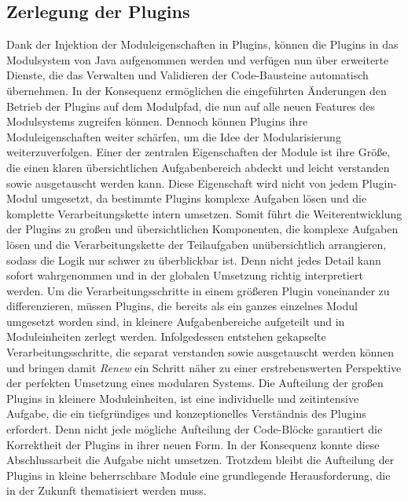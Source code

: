  \subsection*{Zerlegung der Plugins}
	Dank der Injektion der Moduleigenschaften in Plugins, können die Plugins in das Modulsystem von Java aufgenommen werden und verfügen nun über erweiterte Dienste, die das Verwalten und Validieren der Code-Bausteine automatisch übernehmen. In der Konsequenz ermöglichen die eingeführten Änderungen den Betrieb der Plugins auf dem Modulpfad, die nun auf alle neuen Features des Modulsystems zugreifen können. Dennoch können Plugins ihre Moduleigenschaften weiter schärfen, um die Idee der Modularisierung weiterzuverfolgen. \newline
	Einer der zentralen Eigenschaften der Module ist ihre Größe, die einen klaren übersichtlichen Aufgabenbereich abdeckt und leicht verstanden sowie ausgetauscht werden kann. Diese Eigenschaft wird nicht von jedem Plugin-Modul umgesetzt, da bestimmte Plugins komplexe Aufgaben lösen und die komplette Verarbeitungskette intern umsetzen. Somit führt die Weiterentwicklung der Plugins zu großen und übersichtlichen Komponenten, die komplexe Aufgaben lösen und die Verarbeitungskette der Teilaufgaben unübersichtlich arrangieren, sodass die Logik nur schwer zu überblickbar ist. Denn nicht jedes Detail kann sofort wahrgenommen und in der globalen Umsetzung richtig interpretiert werden.\newline
	Um die Verarbeitungsschritte in einem größeren Plugin voneinander zu differenzieren, müssen Plugins, die bereits als ein ganzes einzelnes Modul umgesetzt worden sind, in kleinere Aufgabenbereiche aufgeteilt und in Moduleinheiten zerlegt werden. Infolgedessen entstehen gekapselte Verarbeitungsschritte, die separat verstanden sowie ausgetauscht werden können und bringen damit  \textit{Renew} ein Schritt näher zu einer erstrebenswerten Perspektive der perfekten Umsetzung eines modularen Systems. \newline
	Die Aufteilung der großen Plugins in kleinere Moduleinheiten, ist eine individuelle und zeitintensive Aufgabe, die ein tiefgründiges und konzeptionelles Verständnis des Plugins erfordert. Denn nicht jede mögliche Aufteilung der Code-Blöcke garantiert die Korrektheit der Plugins in ihrer neuen Form. \newline
	In der Konsequenz konnte diese Abschlussarbeit die Aufgabe nicht umsetzen. Trotzdem bleibt die Aufteilung der Plugins in kleine beherrschbare Module eine grundlegende Herausforderung, die in der Zukunft thematisiert werden muss. 

